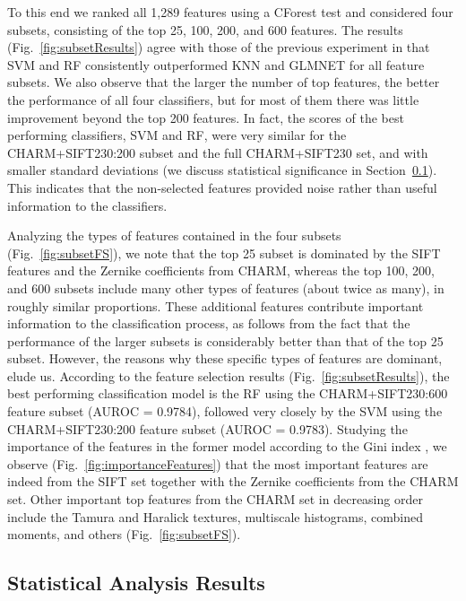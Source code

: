 To this end we ranked all 1,289 features using a {\color{red}CForest test \cite{CForest}} and considered four subsets, consisting of the top 25, 100, 200, and 600 features. The results (Fig.~\ref{fig:subsetResults}) agree with those of the previous experiment in that SVM and RF consistently outperformed KNN and GLMNET for all feature subsets. We also observe that the larger the number of top features, the better the performance of all four classifiers, but for most of them there was little improvement beyond the top 200 features. In fact, the scores of the best performing classifiers, SVM and RF, were very similar for the CHARM+SIFT230:200 subset and the full CHARM+SIFT230 set, and with smaller standard deviations (we discuss statistical significance in Section~\ref{subsec:experimentalAnalysis}). This indicates that the non-selected features provided noise rather than useful information to the classifiers.

Analyzing the types of features contained in the four subsets (Fig.~\ref{fig:subsetFS}), we note that the top 25 subset is dominated by the SIFT features and the Zernike coefficients from CHARM, whereas the top 100, 200, and 600 subsets include many other types of features (about twice as many), in roughly similar proportions. These additional features contribute important information to the classification process, as follows from the fact that the performance of the larger subsets is considerably better than that of the top 25 subset. However, the reasons why these specific types of features are dominant, elude us. According to the feature selection results (Fig.~\ref{fig:subsetResults}), the best performing classification model is the RF using the CHARM+SIFT230:600 feature subset (AUROC = 0.9784), followed very closely by the SVM using the CHARM+SIFT230:200 feature subset (AUROC = 0.9783). Studying the importance of the features in the former model according to the Gini index \cite{Breiman2001}, we observe (Fig.~\ref{fig:importanceFeatures}) that the most important features are indeed from the SIFT set together with the Zernike coefficients from the CHARM set. Other important top features from the CHARM set in decreasing order include the Tamura and Haralick textures, multiscale histograms, combined moments, and others (Fig.~\ref{fig:subsetFS}).

\subsection{Statistical Analysis Results}
\label{subsec:experimentalAnalysis}

